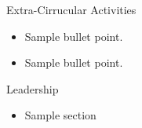 \documentclass{resume} %
\begin{document}
\begin{rSection}{Extra-Cirrucular Activities} 
\begin{itemize}
    \item 	Sample bullet point.
    \item	Sample bullet point.
\end{itemize}


\end{rSection}

\begin{rSection}{Leadership} 
\begin{itemize}
    \item Sample section
\end{itemize}


\end{rSection}
\end{document}

